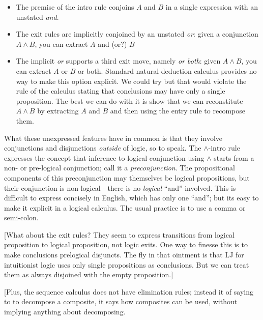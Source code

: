 \documentclass{article}
\begin{document}
\begin{itemize}
\item The premise of the intro rule conjoins \(A\) and \(B\) in a single expression
  with an unstated \textit{and}.
  \item The exit rules are implicitly conjoined by an unstated
    \textit{or}: given a conjunction \(A\land B\), you can extract
    \(A\) and (or?) \(B\)
  \item The implicit \textit{or} supports a third exit move, namely
    \textit{or both}: given \(A\land B\), you can extract \(A\) or
    \(B\) or both. Standard natural deduction calculus provides no way
    to make this option explicit. We could try%
but that would violate the rule of the calculus stating that
conclusions may have only a single proposition. The best we can do
with it is show that we can reconstitute \(A\land B\) by extracting
\(A\) and \(B\) and then using the entry rule to recompose them.
\end{itemize}

What these unexpressed features have in common is that they involve
conjunctions and disjunctions \textit{outside} of logic, so to speak.
The \(\land\text{-intro}\) rule expresses the concept that inference
to logical conjunction using \(\land\) starts from a non- or
pre-logical conjunction; call it a \textit{preconjunction}. The
propositional components of this preconjunction may themselves be
logical propositions, but their conjunction is non-logical - there is
no \textit{logical} ``and'' involved. This is difficult to express
concisely in English, which has only one ``and''; but its easy to make
it explicit in a logical calculus. The usual practice is to use a
comma or semi-colon.

[What about the exit rules? They seem to express transitions from
  logical proposition to logical proposition, not logic exits. One way
  to finesse this is to make conclusions prelogical disjuncts. The fly
  in that ointment is that LJ for intuitionist logic uses only single
  propositions as conclusions. But we can treat them as always
  disjoined with the empty proposition.]

[Plus, the sequence calculus does not have elimination rules; instead
  it of saying to to decompose a composite, it says how composites can
  be used, without implying anything about decomposing.
\end{document}
